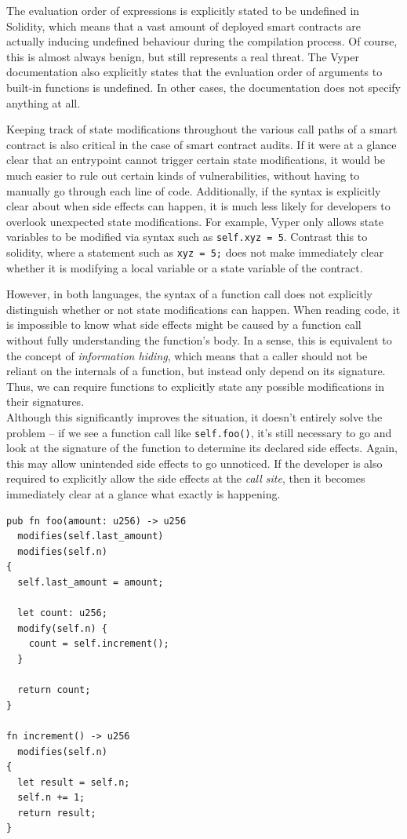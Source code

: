 The evaluation order of expressions is explicitly stated to be undefined in Solidity, which means that a vast amount of deployed smart contracts are actually inducing undefined behaviour during the compilation process. Of course, this is almost always benign, but still represents a real threat. The Vyper documentation also explicitly states that the evaluation order of arguments to built-in functions is undefined. In other cases, the documentation does not specify anything at all.

Keeping track of state modifications throughout the various call paths of a smart contract is also critical in the case of smart contract audits. If it were at a glance clear that an entrypoint cannot trigger certain state modifications, it would be much easier to rule out certain kinds of vulnerabilities, without having to manually go through each line of code. Additionally, if the syntax is explicitly clear about when side effects can happen, it is much less likely for developers to overlook unexpected state modifications. For example, Vyper only allows state variables to be modified via syntax such as \lstinline{self.xyz = 5}. Contrast this to solidity, where a statement such as \lstinline{xyz = 5;} does not make immediately clear whether it is modifying a local variable or a state variable of the contract.

However, in both languages, the syntax of a function call does not explicitly distinguish whether or not state modifications can happen. When reading code, it is impossible to know what side effects might be caused by a function call without fully understanding the function's body. In a sense, this is equivalent to the concept of \textit{information hiding}, which means that a caller should not be reliant on the internals of a function, but instead only depend on its signature. Thus, we can require functions to explicitly state any possible modifications in their signatures.\\
Although this significantly improves the situation, it doesn't entirely solve the problem -- if we see a function call like \lstinline{self.foo()}, it's still necessary to go and look at the signature of the function to determine its declared side effects. Again, this may allow unintended side effects to go unnoticed. If the developer is also required to explicitly allow the side effects at the \textit{call site}, then it becomes immediately clear at a glance what exactly is happening.

\begin{lstlisting}
pub fn foo(amount: u256) -> u256
  modifies(self.last_amount)
  modifies(self.n)
{
  self.last_amount = amount;

  let count: u256;
  modify(self.n) {
    count = self.increment();
  }

  return count;
}

fn increment() -> u256
  modifies(self.n)
{
  let result = self.n;
  self.n += 1;
  return result;
}
\end{lstlisting}

